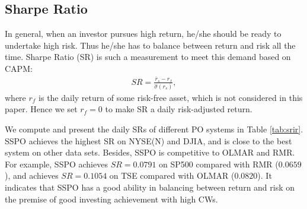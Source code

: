 \documentclass[twoside,11pt]{article}
\begin{document}
\subsection{Sharpe Ratio}
\label{sec:sharperatio}
In general, when an investor pursues high return, he/she should be ready to undertake high risk. Thus he/she has to balance between return and risk all the time. Sharpe Ratio (SR) \citep{SHARPratio} is such a measurement to meet this demand based on CAPM:
\begin{eqnarray}
\label{eqn:sharperatio}
SR=\frac{\bar{r}_{s}-{r}_{f}}{\hat{\sigma}({r}_{s})},
\end{eqnarray}
where ${r}_{f}$ is the daily return of some risk-free asset, which is not considered in this paper. Hence we set ${r}_{f}=0$ to make SR a daily risk-adjusted return.

We compute and present the daily SRs of different PO systems in Table \ref{tab:srir}. SSPO achieves the highest SR on NYSE(N) and DJIA, and is close to the best system on other data sets. Besides, SSPO is competitive to OLMAR and RMR. For example, SSPO achieves $SR=0.0791$ on SP500 compared with RMR ($0.0659$), and achieves $SR=0.1054$ on TSE compared with OLMAR ($0.0820$). It indicates that SSPO has a good ability in balancing between return and risk on the premise of good investing achievement with high CWs.
\end{document}
